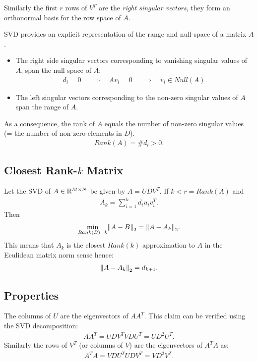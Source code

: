 Similarly the first $r$ rows of $V^T$ are the \emph{right singular vectors}, they form an orthonormal basis for the row space of $A$.

SVD provides an explicit representation of the range and null-space of a matrix $A$.
\begin{itemize}
\item The right side singular vectors corresponding to vanishing singular values of $A$, span the null space of $A$:
\begin{align*}
d_i = 0 \quad \implies \quad Av_i = 0 \quad \implies \quad v_i \in Null(A).
\end{align*}
\item The left singular vectors corresponding to the non-zero singular values of $A$ span the range of $A$.
\end{itemize}
As a consequence, the rank of $A$ equals the number of non-zero singular values (= the number of non-zero elements in $D$).
\begin{align*}
Rank(A) = \# d_i > 0.
\end{align*}
\subsection{Closest Rank-$k$ Matrix}
Let the SVD of $A \in \mathbb{R}^{M\times N}$  be given by $A=UDV^T$. If $k<r = Rank(A)$ and
\begin{align*}
    A_k = \sum_{i=1}^k d_i u_i v_i^T.
\end{align*}
Then 
\begin{align*}
    \min_{Rank(B)=k} \norm{A-B}_2 = \norm{A-A_k}_2.
\end{align*}
This means that $A_k$ is the closest $Rank(k)$ approximation to $A$ in the Eculidean matrix norm sense hence:
\begin{align*}
    \left\lVert A-A_k\right\rVert_2 = d_{k+1}.
\end{align*}

\subsection{Properties}
The columns of $U$ are the eigenvectors of $AA^T$. This claim can be verified using the SVD decomposition:
\begin{align*}
    AA^T = UDV^T VDU^T = UD^2U^T.
\end{align*}
Similarly the rows of $V^T$ (or columns of $V$) are the eigenvectors of $A^TA$ as:
\begin{align*}
    A^TA = VDU^T UDV^T = VD^2V^T.
\end{align*}

